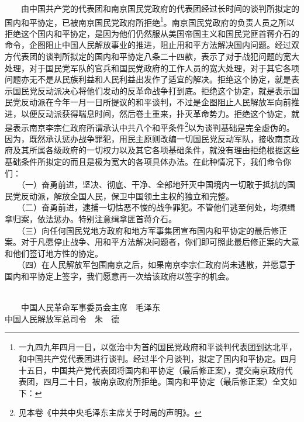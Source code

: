 \documentclass[cn,11pt,chinese]{elegantbook}
\begin{document}
　　由中国共产党的代表团和南京国民党政府的代表团经过长时间的谈判所拟定的国内和平协定，已被南京国民党政府所拒绝\footnote[1]{ 一九四九年四月一日，以张治中为首的国民党政府和平谈判代表团到达北平，和中国共产党代表团进行谈判。经过半个月谈判，拟定了国内和平协定。四月十五日，中国共产党代表团将国内和平协定（最后修正案），提交南京政府代表团，四月二十日，被南京政府所拒绝。国内和平协定（最后修正案）全文如下：}。南京国民党政府的负责人员之所以拒绝这个国内和平协定，是因为他们仍然服从美国帝国主义和国民党匪首蒋介石的命令，企图阻止中国人民解放事业的推进，阻止用和平方法解决国内问题。经过双方代表团的谈判所拟定的国内和平协定八条二十四款，表示了对于战犯问题的宽大处理，对于国民党军队的官兵和国民党政府的工作人员的宽大处理，对于其它各项问题亦无不是从民族利益和人民利益出发作了适宜的解决。拒绝这个协定，就是表示国民党反动派决心将他们发动的反革命战争打到底。拒绝这个协定，就是表示国民党反动派在今年一月一日所提议的和平谈判，不过是企图阻止人民解放军向前推进，以便反动派获得喘息时间，然后卷土重来，扑灭革命势力。拒绝这个协定，就是表示南京李宗仁政府所谓承认中共八个和平条件\footnote[2]{ 见本卷《中共中央毛泽东主席关于时局的声明》。}以为谈判基础是完全虚伪的。因为，既然承认惩办战争罪犯，用民主原则改编一切国民党反动军队，接收南京政府及其所属各级政府的一切权力以及其它各项基础条件，就没有理由拒绝根据这些基础条件所拟定的而且是极为宽大的各项具体办法。在此种情况下，我们命令你们：\\
　　（一）奋勇前进，坚决、彻底、干净、全部地歼灭中国境内一切敢于抵抗的国民党反动派，解放全国人民，保卫中国领土主权的独立和完整。\\
　　（二）奋勇前进，逮捕一切怙恶不悛的战争罪犯。不管他们逃至何处，均须缉拿归案，依法惩办。特别注意缉拿匪首蒋介石。\\
　　（三）向任何国民党地方政府和地方军事集团宣布国内和平协定的最后修正案。对于凡愿停止战争、用和平方法解决问题者，你们即可照此最后修正案的大意和他们签订地方性的协定。\\
　　（四）在人民解放军包围南京之后，如果南京李宗仁政府尚未逃散，并愿意于国内和平协定上签字，我们愿意再一次给该政府以签字的机会。\\
　　\begin{flushright}
　　中国人民革命军事委员会主席　毛泽东\\
中国人民解放军总司令　朱　德
　　\end{flushright}
\end{document}
